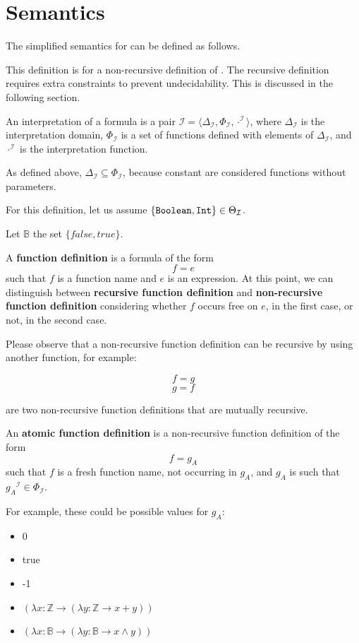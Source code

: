 \section{Semantics}

\newcommand{\I}[1]{\ensuremath{{#1}^{\mathcal{I}}}}

\newcommand{\DeltaI}{\ensuremath{\Delta _{\mathcal{I}}}}
\newcommand{\ThetaI}{\ensuremath{\Theta _{\mathcal{I}}}}
\newcommand{\PhiI}{\ensuremath{\Phi _{\mathcal{I}}}}

The simplified semantics for \Soda can be defined as follows.

This definition is for a non-recursive definition of \Soda.
The recursive definition requires extra constraints to prevent undecidability.
This is discussed in the following section.

An interpretation of a \Soda formula is a pair $\mathcal{I} = \langle \DeltaI, \PhiI, \I{\cdot} \rangle$, where $\DeltaI$ is the interpretation domain, $\PhiI$ is a set of functions defined with elements of $\DeltaI$, and $\I{\cdot}$ is the interpretation function.

As defined above, $\DeltaI \subseteq \PhiI$, because constant are considered functions without parameters.

For this definition, let us assume $\{\texttt{{Boolean}}, \texttt{{Int}}\} \in \Theta _{\mathcal{I}}$.

Let $\mathbb{B}$ the set $\{false, true\}$.

A \textbf{function definition} is a formula of the form
$$f = e$$
such that $f$ is a function name and $e$ is an expression.
At this point, we can distinguish between \textbf{recursive function definition} and \textbf{non-recursive function definition} considering whether $f$ occurs free on $e$, in the first case, or not, in the second case.

Please observe that a non-recursive function definition can be recursive by using another function, for example:
\begin{center}
    $$f = g$$
    $$g = f$$
\end{center}
are two non-recursive function definitions that are mutually recursive.

An \textbf{atomic function definition} is a non-recursive function definition of the form
$$f = g_{A}$$
such that $f$ is a fresh function name, not occurring in $g_{A}$, and $g_{A}$ is such that $\I{g_{A}} \in \PhiI$.

For example, these could be possible values for $g_{A}$:
\begin{itemize}
    \item 0
    \item true
    \item -1
    \item $(\lambda x: \mathbb{Z} \to (\lambda y: \mathbb{Z} \to x + y))$
    \item $(\lambda x: \mathbb{B} \to (\lambda y: \mathbb{B} \to x \land y) )$
\end{itemize}

